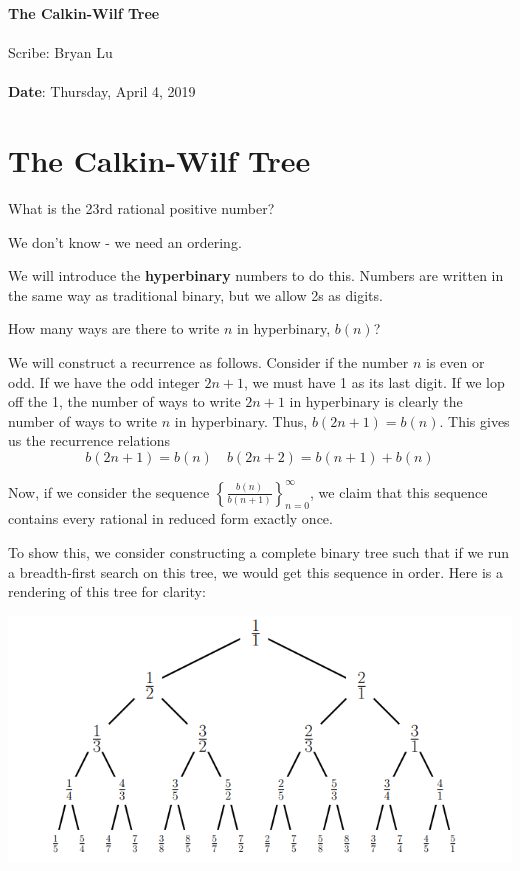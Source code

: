 \documentclass[11pt,twosided]{article}
\def\titlestring{The Calkin-Wilf Tree}
\def\scribestring{Bryan Lu}
\def\datestring{Thursday, April 4, 2019}
\begin{document}
\thispagestyle{plain}  %

\noindent
{\LARGE \textbf{\titlestring}}\\\\
%
{\Large Scribe: \scribestring}\\ \\
{\textbf{Date}: \datestring}


\noindent

\section{The Calkin-Wilf Tree}
\begin{problem}{1}
What is the 23rd rational positive number? 	
\end{problem}
\begin{solution}
	We don't know - we need an ordering. 
\end{solution}

We will introduce the \textbf{hyperbinary} numbers to do this. Numbers are written in the same way as traditional binary, but we allow 2s as digits. 

\begin{problem}{2}
How many ways are there to write $n$ in hyperbinary, $b(n)$? 
\end{problem}
\begin{solution}
	We will construct a recurrence as follows. Consider if the number $n$ is even or odd. If we have the odd integer $2n+1$, we must have 1 as its last digit. If we lop off the 1, the number of ways to write $2n+1$ in hyperbinary is clearly the number of ways to write $n$ in hyperbinary. Thus, $b(2n+1) = b(n)$. 	
This gives us the recurrence relations 
\[
	b(2n+1) = b(n) \quad b(2n+2) = b(n+1) + b(n)
\]	
\end{solution}

Now, if we consider the sequence $\left\{\frac{b(n)}{b(n+1)}\right\}_{n=0}^\infty$, we claim that this sequence contains every rational in reduced form exactly once. 

To show this, we consider constructing a complete binary tree such that if we run a breadth-first search on this tree, we would get this sequence in order. Here is a rendering of this tree for clarity:

\begin{center}
\includegraphics[scale=0.9]{calkinwilf.png}\\
\end{center}
\end{document}
